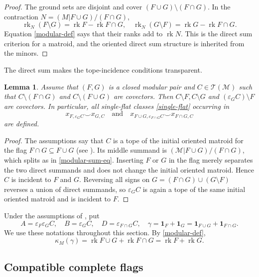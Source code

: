 \documentclass[10pt]{amsart}
\theoremstyle{plain}
\newtheorem{lemma}[theorem]{Lemma}
\theoremstyle{definition}
\newcommand{\one}{\mathbf{1}}
\newcommand{\T}{\mathcal{T}}
\newcommand{\M}{\mathcal{M}}
\newcommand{\rk}{\operatorname{rk}}
\newcommand{\eps}{\varepsilon}
\begin{document}
\begin{proof}
The ground sets are disjoint and cover $(F\cup G)\setminus (F\cap G)$. In the contraction $N=(M|F\cup G)/(F\cap G)$,
\[
\rk_N(F\setminus G)=\rk F-\rk F\cap G, \quad \rk_N(G\setminus F)=\rk G-\rk F\cap G.
\]
Equation \eqref{modular-def} says that their ranks add to $\rk N$. This is the direct sum criterion for a matroid, and the oriented direct sum structure is inherited from the minors.
\end{proof}

The direct sum makes the tope-incidence conditions transparent.

\begin{lemma}\label{incidence-refinement}
Assume that $(F,G)$ is a closed modular pair and $C\in\T(\M)$ such that $C\setminus (F\cap G)$ and $C\setminus (F\cup G)$ are covectors. Then $C\setminus F,C\setminus G$ and $(\eps_G C)\setminus F$ are covectors. In particular, all single-flat classes \eqref{single-flat} occurring in
\[
x_{F,\eps_G C}\smile x_{G,C}\quad\text{and}\quad x_{F\cup G,\eps_{F\cap G}C}\smile x_{F\cap G,C}
\]
are defined.
\end{lemma}

\begin{proof}
The assumptions say that $C$ is a tope of the initial oriented matroid for the flag $F\cap G\subseteq F\cup G$ (see ). Its middle summand is $(\M|F\cup G)/(F\cap G)$, which splits as in \eqref{modular-sum-eq}. Inserting $F$ or $G$ in the flag merely separates the two direct summands and does not change the initial oriented matroid. Hence $C$ is incident to $F$ and $G$. Reversing all signs on $G=(F\cap G)\cup(G\setminus F)$ reverses a union of direct summands, so $\eps_G C$ is again a tope of the same initial oriented matroid and is incident to $F$.
\end{proof}

Under the assumptions of , put
\[
A=\eps_F\eps_G C,\quad B=\eps_G C,\quad D=\eps_{F\cap G}C,\quad \gamma=\one_F+\one_G=\one_{F\cup G}+\one_{F\cap G}.
\]
We use these notations throughout this section. By \eqref{modular-def},
\begin{equation}\label{modular-degree}
\kappa_M(\gamma)=\rk F\cup G+\rk F\cap G=\rk F+\rk G.
\end{equation}

\subsection{Compatible complete flags}
\end{document}
